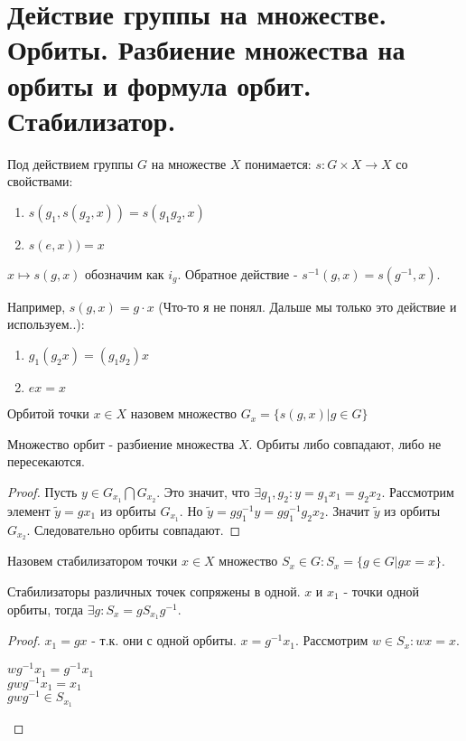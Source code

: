 \section{Действие группы на множестве. Орбиты. Разбиение множества на орбиты и формула орбит. Стабилизатор.}

\begin{defn}
Под действием группы $G$ на множестве $X$ понимается: $s: G \times X \rightarrow X$ со свойствами:
\begin{enumerate}
  \item $s(g_1, s(g_2, x)) = s(g_1 g_2, x)$
  \item $s(e, x)) = x$
\end{enumerate}
\end{defn}

\vspace{0.5cm}
$x \mapsto s(g, x)$ обозначим как $i_g$. Обратное действие - $s^{-1}(g, x) = s(g^{-1}, x)$. \\
\par Например, $s(g, x) = g \cdot x$ (Что-то я не понял. Дальше мы только это действие и используем..):
\begin{enumerate}
 \item $g_1(g_2x) = (g_1g_2)x$
 \item $ex = x$
\end{enumerate}

\begin{defn}
Орбитой точки $x \in X$ назовем множество $G_x = \{ s(g, x) | g \in G \}$
\end{defn}

\begin{lem}
Множество орбит - разбиение множества $X$. Орбиты либо совпадают, либо не пересекаются.
\end{lem}
\begin{proof}
Пусть $y \in G_{x_1} \bigcap G_{x_2}$. Это значит, что $ \exists g_1, g_2: y = g_1x_1 = g_2x_2$.
Рассмотрим элемент $\widetilde{y} = gx_1$ из орбиты $G_{x_1}$. Но $\widetilde{y} = gg^{-1}_1y = gg^{-1}_1g_2x_2$. 
Значит $\widetilde{y}$ из орбиты $G_{x_2}$. Следовательно орбиты совпадают.
\end{proof}

\begin{defn}
Назовем стабилизатором точки $x \in X$ множество $S_x \in G: S_x = \{g \in G | gx = x \}$.
\end{defn}

\begin{lem}
Стабилизаторы различных точек сопряжены в одной. $x$ и $x_1$ - точки одной орбиты,
тогда $\exists g: S_x = gS_{x_1}g^{-1}$.
\end{lem}
\begin{proof}
$x_1 = gx$ - т.к. они с одной орбиты. $x = g^{-1}x_1$. Рассмотрим $w \in S_x: wx = x$. 
\begin{center}
$wg^{-1}x_1 = g^{-1}x_1$\\
$gwg^{-1}x_1 = x_1$\\
$gwg^{-1} \in S_{x_1}$
\end{center}
\end{proof}

